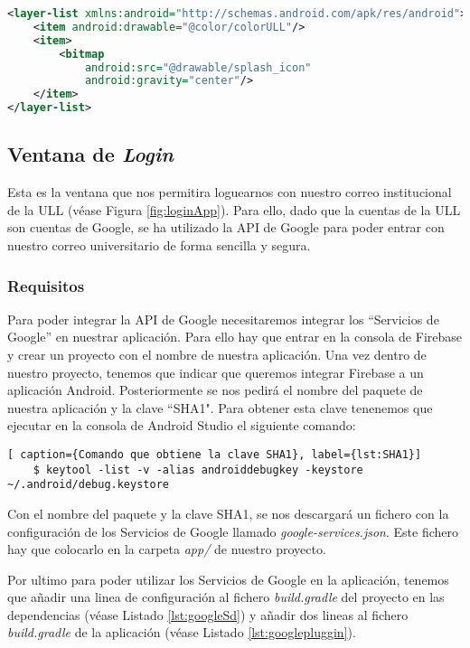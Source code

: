\begin{lstlisting}[language=XML,caption={Fichero  \textit{splash\_ull.xml}, xml con el color de fondo y el logotipo de la aplicación. }, label={lst:splashull}]
<layer-list xmlns:android="http://schemas.android.com/apk/res/android">
    <item android:drawable="@color/colorULL"/>
    <item>
        <bitmap
            android:src="@drawable/splash_icon"
            android:gravity="center"/>
    </item>
</layer-list>
\end{lstlisting}

\subsection{Ventana de \textit{Login} }

Esta es la ventana que nos permitira loguearnos con nuestro correo institucional de la ULL (véase Figura \ref{fig:loginApp}). Para ello, dado que la cuentas de la ULL son cuentas de Google, se ha utilizado la API de Google para poder entrar con nuestro correo universitario de forma sencilla y segura.

\subsubsection{ Requisitos }  

Para poder integrar la API de Google necesitaremos integrar los ``Servicios de Google'' en nuestrar aplicación. Para ello hay que entrar en la consola de Firebase \cite{URL::Firebase} y crear un proyecto con el nombre de nuestra aplicación. Una vez dentro de nuestro proyecto, tenemos que indicar que queremos integrar Firebase a un aplicación Android. Posteriormente se nos pedirá el nombre del paquete de nuestra aplicación y la clave ``SHA1". Para obtener esta clave tenenemos que ejecutar en la consola de Android Studio el siguiente comando: 
 
\begin{lstlisting}[ caption={Comando que obtiene la clave SHA1}, label={lst:SHA1}]
    $ keytool -list -v -alias androiddebugkey -keystore ~/.android/debug.keystore
\end{lstlisting} 

Con el nombre del paquete y la clave SHA1, se nos descargará un fichero  con la configuración de los Servicios de Google llamado \textit{google-services.json}. Este fichero hay que colocarlo en la carpeta \textit{app/} de nuestro proyecto.
 
Por ultimo para poder utilizar los Servicios de Google en la aplicación, tenemos que añadir una linea de configuración al fichero \textit{build.gradle} del proyecto en las dependencias (véase Listado \ref{lst:googleSd}) y añadir dos lineas al fichero \textit{build.gradle} de la aplicación (véase Listado \ref{lst:googlepluggin}).

